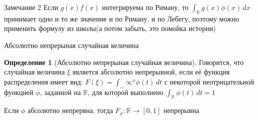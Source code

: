 \documentclass{beamer}%
\theoremstyle{definition}
\newtheorem{mydef}[theorem]{Определение}
\begin{document}
\begin{frame}{Замечание 2} 
    Если $g(x)f(x)$ интегрируема по Риману, то $\int_\mathbb{R}g(x)\phi(x)\,dx$ принимает одно и то же значение и по Риману, и по Лебегу, поэтому можно применить формулу из школы(а потом забыть, это помойка истории) 
    
\end{frame}
\begin{frame}{Абсолютно непрерыная случайная величина}
    
    \begin{mydef}[Абсолютно непрерыная случайная величина]
    Говорится, что случайная величина $\xi$ является абсолютно непрерывной, если её функция распределения имеет вид: $F(\xi) = \int_-\infty^x\phi(t)\,dt$ с некоторой неотрицательной функцией $\phi$, заданной на $\mathbb{R}$, для которой выполнено $\int_\mathbb{R}\phi(t)\,dt =1$
    \end{mydef}
    Если $\phi$ абсолютно непрервна, тогда $F_\phi:\mathbb{R} \rightarrow [0, 1]$ непрерывна
    
    
\end{frame}
\end{document}
